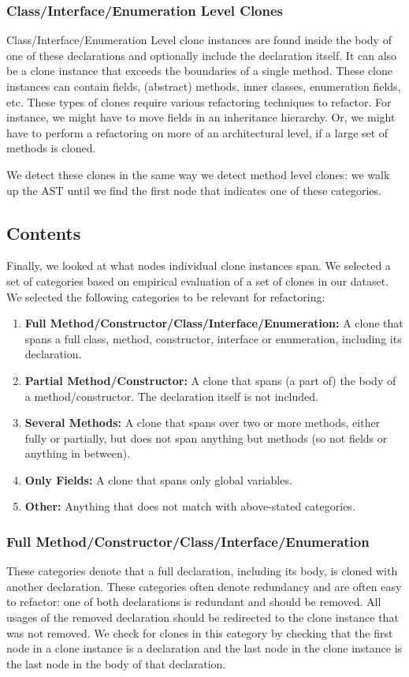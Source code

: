 \subsubsection{Class/Interface/Enumeration Level Clones}
Class/Interface/Enumeration Level clone instances are found inside the body of one of these declarations and optionally include the declaration itself. It can also be a clone instance that exceeds the boundaries of a single method. These clone instances can contain fields, (abstract) methods, inner classes, enumeration fields, etc. These types of clones require various refactoring techniques to refactor. For instance, we might have to move fields in an inheritance hierarchy. Or, we might have to perform a refactoring on more of an architectural level, if a large set of methods is cloned.

We detect these clones in the same way we detect method level clones: we walk up the AST until we find the first node that indicates one of these categories.

\subsection{Contents}\label{sec:setupcontents}
Finally, we looked at what nodes individual clone instances span. We selected a set of categories based on empirical evaluation of a set of clones in our dataset. We selected the following categories to be relevant for refactoring:
\begin{enumerate}
  \item \textbf{Full Method/Constructor/Class/Interface/Enumeration:} A clone that spans a full class, method, constructor, interface or enumeration, including its declaration.
  \item \textbf{Partial Method/Constructor:} A clone that spans (a part of) the body of a method/constructor. The declaration itself is not included.
  \item \textbf{Several Methods:} A clone that spans over two or more methods, either fully or partially, but does not span anything but methods (so not fields or anything in between).
  \item \textbf{Only Fields:} A clone that spans only global variables.
  \item \textbf{Other:} Anything that does not match with above-stated categories.
\end{enumerate}

\subsubsection{Full Method/Constructor/Class/Interface/Enumeration}
These categories denote that a full declaration, including its body, is cloned with another declaration. These categories often denote redundancy and are often easy to refactor: one of both declarations is redundant and should be removed. All usages of the removed declaration should be redirected to the clone instance that was not removed. We check for clones in this category by checking that the first node in a clone instance is a declaration and the last node in the clone instance is the last node in the body of that declaration.

